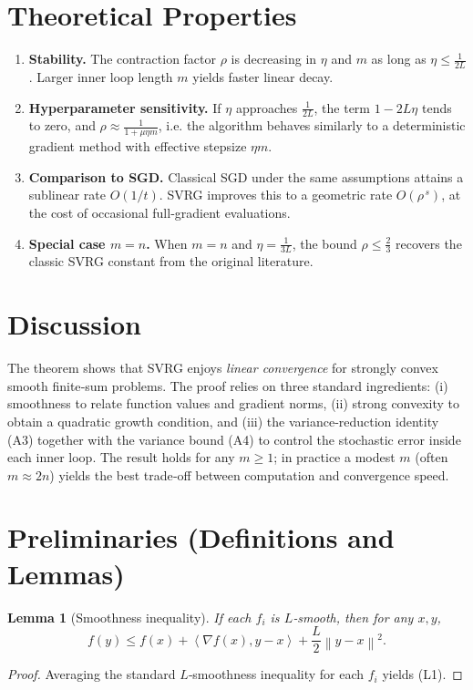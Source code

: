 \documentclass{article}
\newtheorem{lemma}{Lemma}
\newcommand{\norm}[1]{\left\lVert#1\right\rVert}
\newcommand{\inner}[2]{\left\langle #1,#2\right\rangle}
\begin{document}
\section*{Theoretical Properties}
\begin{enumerate}[label=\textbf{P\arabic*}:, leftmargin=*]
\item \textbf{Stability.} The contraction factor $\rho$ is decreasing in $\eta$ and $m$ as long as $\eta\le\frac{1}{2L}$. Larger inner loop length $m$ yields faster linear decay.
\item \textbf{Hyperparameter sensitivity.} If $\eta$ approaches $\frac{1}{2L}$, the term $1-2L\eta$ tends to zero, and $\rho\approx \frac{1}{1+\mu\eta m}$, i.e. the algorithm behaves similarly to a deterministic gradient method with effective stepsize $\eta m$.
\item \textbf{Comparison to SGD.} Classical SGD under the same assumptions attains a sublinear rate $O(1/t)$. SVRG improves this to a geometric rate $O(\rho^{\,s})$, at the cost of occasional full‑gradient evaluations.
\item \textbf{Special case $m=n$.} When $m=n$ and $\eta=\frac{1}{3L}$, the bound $\rho\le \frac{2}{3}$ recovers the classic SVRG constant from the original literature.
\end{enumerate}

\section*{Discussion}
The theorem shows that SVRG enjoys \emph{linear convergence} for strongly convex smooth finite‑sum problems.  The proof relies on three standard ingredients: (i) smoothness to relate function values and gradient norms, (ii) strong convexity to obtain a quadratic growth condition, and (iii) the variance‑reduction identity (A3) together with the variance bound (A4) to control the stochastic error inside each inner loop.  The result holds for any $m\ge1$; in practice a modest $m$ (often $m\approx2n$) yields the best trade‑off between computation and convergence speed.

\section*{Preliminaries (Definitions and Lemmas)}
\begin{lemma}[Smoothness inequality]\label{lem:smooth}
If each $f_i$ is $L$‑smooth, then for any $x,y$,
\[
    f(y) \le f(x) + \inner{\nabla f(x)}{y-x}
           + \frac{L}{2}\norm{y-x}^2.
\tag{L1}
\]
\end{lemma}
\begin{proof}
Averaging the standard $L$‑smoothness inequality for each $f_i$ yields (L1). \qedhere
\end{proof}
\end{document}

